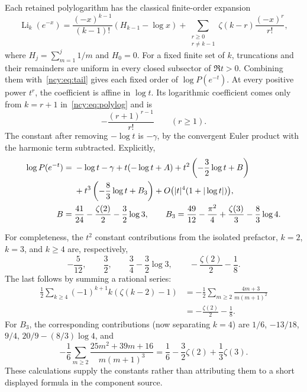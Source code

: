 \documentclass[11pt,letterpaper]{article}
\numberwithin{equation}{section}
\theoremstyle{remark}\newtheorem{remark}[theorem]{Remark}
\newcommand{\Li}{\operatorname{Li}}
\theoremstyle{definition}\newtheorem{definition}[theorem]{Definition}\theoremstyle{plain}
\begin{document}
Each retained polylogarithm has the classical finite-order expansion
\begin{equation}\label{ncy:eq:li}
 \Li_k(e^{-x})=
 \frac{(-x)^{k-1}}{(k-1)!}(H_{k-1}-\log x)
 +\sum_{\substack{r\geq0\\r\ne k-1}}
       \zeta(k-r)\frac{(-x)^r}{r!},
\end{equation}
where $H_j=\sum_{m=1}^j1/m$ and $H_0=0$. For a fixed finite set of
$k$, truncations and their remainders are uniform in every closed
subsector of $\Re t>0$. Combining them with~\eqref{ncy:eq:tail} gives each
fixed order of $\log P(e^{-t})$. At every positive power $t^r$, the
coefficient is affine in $\log t$. Its logarithmic coefficient comes
only from $k=r+1$ in~\eqref{ncy:eq:polylog} and is
\[
 -\frac{(r+1)^{r-1}}{r!}\qquad(r\geq1).
\]
The constant after removing $-\log t$ is $-\gamma$, by the convergent
Euler product with the harmonic term subtracted. Explicitly,
\begin{align}\label{ncy:eq:logP}
 \log P(e^{-t})={}&-\log t-\gamma+t(-\log t+A)
       +t^2\left(-\frac32\log t+B\right)\notag\\
 &+t^3\left(-\frac83\log t+B_3\right)
       +O\bigl(|t|^4(1+|\log t|)\bigr),\\
 B={}&\frac{41}{24}-\frac{\zeta(2)}2-\frac32\log3,\qquad
 B_3=\frac{49}{12}-\frac{\pi^2}{4}
             +\frac{\zeta(3)}3-\frac83\log4.\notag
\end{align}

For completeness, the $t^2$ constant contributions from the isolated
prefactor, $k=2$, $k=3$, and $k\geq4$ are, respectively,
\[
 -\frac5{12},\qquad \frac32,\qquad
 \frac34-\frac32\log3,\qquad -\frac{\zeta(2)}2-\frac18.
\]
The last follows by summing a rational series:
\begin{align*}
 \frac12\sum_{k\geq4}(-1)^{k+1}k(\zeta(k-2)-1)
 &=-\frac12\sum_{m\geq2}\frac{4m+3}{m(m+1)^2}\\
 &=-\frac{\zeta(2)}2-\frac18.
\end{align*}
For $B_3$, the corresponding contributions (now separating $k=4$)
are $1/6$, $-13/18$, $9/4$, $20/9-(8/3)\log4$, and
\[
 -\frac16\sum_{m\geq2}\frac{25m^2+39m+16}{m(m+1)^3}
   =\frac16-\frac32\zeta(2)+\frac13\zeta(3).
\]
These calculations supply the constants rather than attributing them
to a short displayed formula in the component source.
\end{document}
